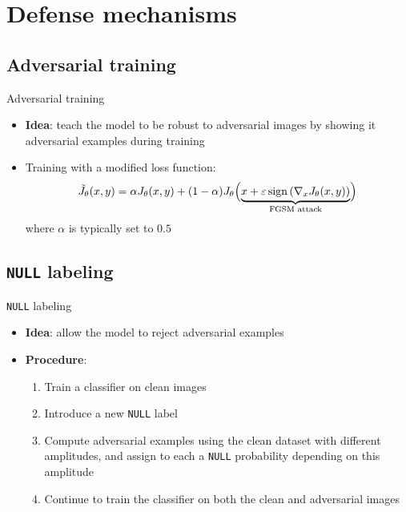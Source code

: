 \documentclass[aspectratio=169]{beamer}
\theoremstyle{definition}
\renewcommand{\epsilon}{\varepsilon}
\DeclareMathOperator*{\sign}{sign}
\begin{document}
\section{Defense mechanisms}
\subsection{Adversarial training}
\begin{frame}{Adversarial training}
  \begin{itemize}
    \item \textbf{Idea}: teach the model to be robust to adversarial images by showing it adversarial examples during training
    \item Training with a modified loss function:
    \begin{equation*}
      \tilde{J}_\theta(x, y) = \alpha J_\theta(x, y) + (1-\alpha)J_\theta\Bigl(\underbrace{x+\epsilon\sign\left(\nabla_x J_\theta(x, y)\right)}_{\text{FGSM attack}}\Bigr)
    \end{equation*}
    where $\alpha$ is typically set to $0.5$
  \end{itemize}
\end{frame}

\subsection{\texttt{NULL} labeling}
\begin{frame}{\texttt{NULL} labeling}
  \begin{itemize}
    \item \textbf{Idea}: allow the model to reject adversarial examples
    \item \textbf{Procedure}:
    \begin{enumerate}
      \item Train a classifier on clean images
      \item Introduce a new \texttt{NULL} label
      \item Compute adversarial examples using the clean dataset with different amplitudes, and assign to each a \texttt{NULL} probability depending on this amplitude
      \item Continue to train the classifier on both the clean and adversarial images
    \end{enumerate}
  \end{itemize}
\end{frame}
\end{document}
